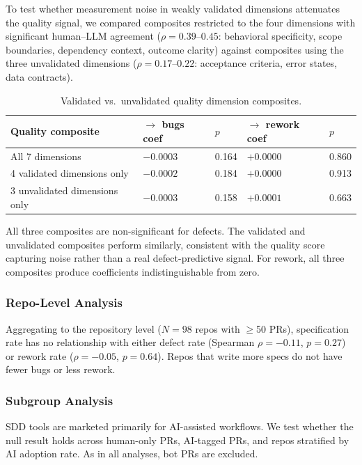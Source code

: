 \documentclass[a4paper,UKenglish,cleveref,autoref,thm-restate]{lipics-v2021}
\begin{document}
To test whether measurement noise in weakly validated dimensions attenuates the quality signal, we compared composites restricted to the four dimensions with significant human--LLM agreement ($\rho = 0.39$--$0.45$: behavioral specificity, scope boundaries, dependency context, outcome clarity) against composites using the three unvalidated dimensions ($\rho = 0.17$--$0.22$: acceptance criteria, error states, data contracts).

\begin{table}[t]
\centering
\caption{Validated vs.\ unvalidated quality dimension composites.}
\label{tab:quality-composites}
\begin{tabular}{@{}lllll@{}}
\toprule
\textbf{Quality composite} & \textbf{$\rightarrow$ bugs coef} & \textbf{$p$} & \textbf{$\rightarrow$ rework coef} & \textbf{$p$} \\
\midrule
All 7 dimensions & $-0.0003$ & 0.164 & $+0.0000$ & 0.860 \\
4 validated dimensions only & $-0.0002$ & 0.184 & $+0.0000$ & 0.913 \\
3 unvalidated dimensions only & $-0.0003$ & 0.158 & $+0.0001$ & 0.663 \\
\bottomrule
\end{tabular}
\end{table}

All three composites are non-significant for defects. The validated and unvalidated composites perform similarly, consistent with the quality score capturing noise rather than a real defect-predictive signal. For rework, all three composites produce coefficients indistinguishable from zero.

\subsubsection{Repo-Level Analysis}

Aggregating to the repository level ($N = 98$ repos with $\geq$50 PRs), specification rate has no relationship with either defect rate (Spearman $\rho = -0.11$, $p = 0.27$) or rework rate ($\rho = -0.05$, $p = 0.64$). Repos that write more specs do not have fewer bugs or less rework.

\subsubsection{Subgroup Analysis}

SDD tools are marketed primarily for AI-assisted workflows. We test whether the null result holds across human-only PRs, AI-tagged PRs, and repos stratified by AI adoption rate. As in all analyses, bot PRs are excluded.
\end{document}
